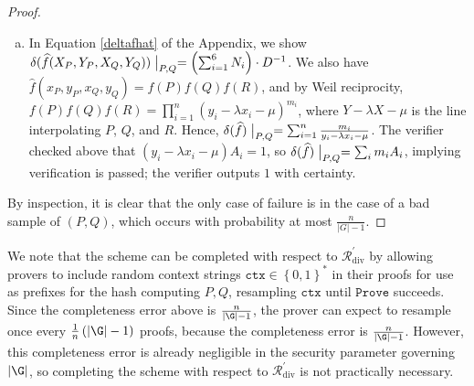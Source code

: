 \documentclass[11pt,letterpaper]{article}
\newcommand{\rigo}[1]{{\textcolor{blue}{#1}}}
\theoremstyle{definition}
\newcommand{\6}{\mathbf}
\newcommand{\7}{\mathcal}
\begin{document}
\begin{proof}
\begin{enumerate}[(a)]
\item In Equation \ref{deltafhat} of the Appendix, we show $\delta(\widehat{f}(X_P,Y_P,X_Q,Y_Q)) \bigm\vert_{P,Q} = \left( \sum_{i = 1}^6 N_i \right) \cdot D^{-1}$.   We also have $\widehat{f}(x_P,y_P,x_Q,y_Q) = f(P)f(Q)f(R)$, and by Weil reciprocity, $f(P)f(Q)f(R) = \prod_{i=1}^{n} (y_i - \lambda x_i - \mu)^{m_i}$, where $Y - \lambda X - \mu$ is the line interpolating $P$, $Q$, and $R$. Hence, $\delta(\widehat{f}) \bigm\vert_{P,Q} = \sum_{i=1}^{n} \frac{m_i}{y_i-\lambda x_i - \mu}$. The verifier checked above that $(y_i-\lambda x_i - \mu)A_i = 1$, so $\delta(\widehat{f}) \bigm\vert_{P,Q} = \sum_i m_i A_i$, implying verification is passed; the verifier outputs $1$ with certainty.
\end{enumerate}

By inspection, it is clear that the only case of failure is in the case of a bad sample of $(P, Q)$, which occurs with probability at most $\frac{n}{\left|G\right|-1}$. 
\end{proof}

We note that the scheme can be completed with respect to $\mathcal{R}_{\text{div}}^\prime$ by  allowing provers to include random context strings $\texttt{ctx} \in \left\{0,1\right\}^*$ in their proofs for use as prefixes for the hash computing $P, Q$, resampling $\texttt{ctx}$ until $\texttt{Prove}$ succeeds. Since the completeness error above is $\frac{n}{\left|\G\right|-1}$, the prover can expect to resample once every $\frac{1}{n}\left(\left|\G\right|-1\right)$ proofs, because the completeness error is $\frac{n}{\left|\G\right|-1}$. However, this completeness error is already negligible in the security parameter governing $\left|\G\right|$, so completing the scheme with respect to $\mathcal{R}_{\text{div}}^\prime$ is not practically necessary.
\end{document}
